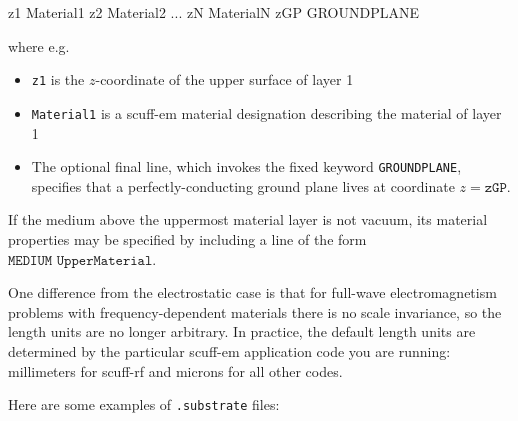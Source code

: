 \documentclass[letterpaper]{article}
\begin{document}
\medskip

\begin{verbcode}
z1  Material1
z2  Material2
...
zN  MaterialN
zGP GROUNDPLANE
\end{verbcode}

\medskip

where e.g.
\begin{itemize}
 \item \texttt{z1} is the $z$-coordinate of the upper surface of
       layer 1
 \item \texttt{Material1} is a {\sc scuff-em} material designation
       describing the material of layer 1
 \item The optional 
       final line, which invokes the fixed keyword \texttt{GROUNDPLANE},
       specifies that a perfectly-conducting ground plane lives at 
       coordinate $z=\texttt{zGP}$.
\end{itemize}
If the medium above the uppermost material layer is not vacuum,
its material properties may be specified by including a line of the form
$\texttt{MEDIUM UpperMaterial}.$

One difference from the electrostatic case is that for full-wave
electromagnetism problems with frequency-dependent materials
there is no scale invariance, so the length units are no longer
arbitrary. In practice, the default length units are determined
by the particular {\sc scuff-em} application code you are running:
millimeters for {\sc scuff-rf} and microns for all other codes.

Here are some examples of \texttt{.substrate} files:
\end{document}

